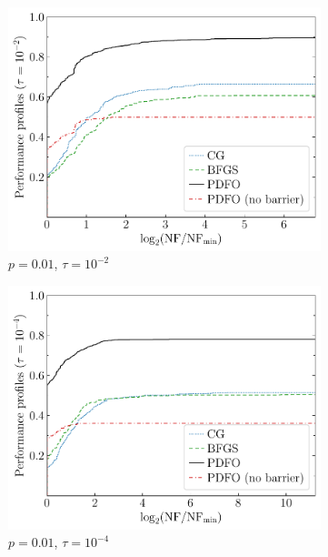 \documentclass[
    smallextended,  %
    draft,          %
    final,          %
]{svjour3}
\begin{document}
\begin{figure}[htbp]
    \begin{subfigure}{.48\textwidth}
        \centering
        \includegraphics[width=\textwidth]{perf-nan-bfgs_cg_pdfo-50-0.01-2}
        \caption{$p = 0.01$, $\tau = 10^{-2}$}
    \end{subfigure}
    \hfill
    \begin{subfigure}{.48\textwidth}
        \centering
        \includegraphics[width=\textwidth]{perf-nan-bfgs_cg_pdfo-50-0.01-4}
        \caption{$p = 0.01$, $\tau = 10^{-4}$}
    \end{subfigure}
    \hfill
    \begin{subfigure}{.48\textwidth}

\end{subfigure}
\end{figure}
\end{document}
